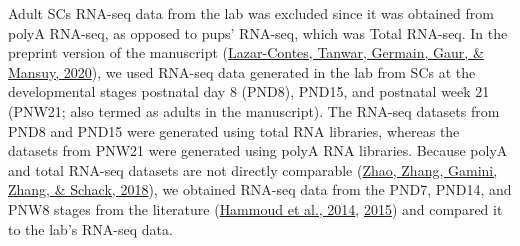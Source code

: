 \documentclass[12pt,twoside]{reedthesis}
\begin{document}
Adult SCs RNA-seq data from the lab was excluded since it was obtained
from polyA RNA-seq, as opposed to pups' RNA-seq, which was Total
RNA-seq. In the preprint version of the manuscript (\protect\hyperlink{ref-lazarcontes_2020}{Lazar-Contes, Tanwar, Germain, Gaur, \& Mansuy, 2020}),
we used RNA-seq data generated in the lab from SCs at the developmental
stages postnatal day 8 (PND8), PND15, and postnatal week 21 (PNW21; also
termed as adults in the manuscript). The RNA-seq datasets from PND8 and
PND15 were generated using total RNA libraries, whereas the datasets
from PNW21 were generated using polyA RNA libraries. Because polyA and
total RNA-seq datasets are not directly comparable (\protect\hyperlink{ref-zhao_2018}{Zhao, Zhang, Gamini, Zhang, \& Schack, 2018}), we
obtained RNA-seq data from the PND7, PND14, and PNW8 stages from the
literature (\protect\hyperlink{ref-hammoud2014}{Hammoud et al., 2014}, \protect\hyperlink{ref-hammoud2015}{2015}) and compared it to the lab's
RNA-seq data.
\end{document}
